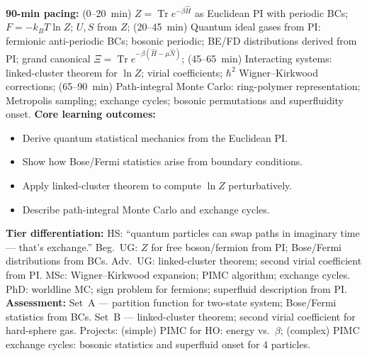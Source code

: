 \documentclass[11pt,a4paper]{article}
\begin{document}
\begin{tcolorbox}[modulebox, title={Module~II.2 --- Lecture L06: Statistical Mechanics Connection}]
\textbf{90-min pacing:} (0--20~min) $Z=\operatorname{Tr}e^{-\beta\hat{H}}$ as Euclidean PI with periodic BCs; $F=-k_BT\ln Z$; $U,S$ from $Z$; (20--45~min) Quantum ideal gases from PI: fermionic anti-periodic BCs; bosonic periodic; BE/FD distributions derived from PI; grand canonical $\Xi=\operatorname{Tr}e^{-\beta(\hat{H}-\mu\hat{N})}$; (45--65~min) Interacting systems: linked-cluster theorem for $\ln Z$; virial coefficients; $\hbar^2$ Wigner--Kirkwood corrections; (65--90~min) Path-integral Monte Carlo: ring-polymer representation; Metropolis sampling; exchange cycles; bosonic permutations and superfluidity onset.
\medskip\textbf{Core learning outcomes:}
\begin{itemize}[leftmargin=1.4em,topsep=2pt,itemsep=1pt]
  \item Derive quantum statistical mechanics from the Euclidean PI.
  \item Show how Bose/Fermi statistics arise from boundary conditions.
  \item Apply linked-cluster theorem to compute $\ln Z$ perturbatively.
  \item Describe path-integral Monte Carlo and exchange cycles.
\end{itemize}
\medskip\textbf{Tier differentiation:}
HS: ``quantum particles can swap paths in imaginary time --- that's exchange.''
Beg.\ UG: $Z$ for free boson/fermion from PI; Bose/Fermi distributions from BCs.
Adv.\ UG: linked-cluster theorem; second virial coefficient from PI.
MSc: Wigner--Kirkwood expansion; PIMC algorithm; exchange cycles.
PhD: worldline MC; sign problem for fermions; superfluid description from PI.
\medskip\textbf{Assessment:}
Set~A --- partition function for two-state system; Bose/Fermi statistics from BCs.
Set~B --- linked-cluster theorem; second virial coefficient for hard-sphere gas.
Projects: (simple) PIMC for HO: energy vs.\ $\beta$; (complex) PIMC exchange cycles: bosonic statistics and superfluid onset for 4 particles.
\end{tcolorbox}

\medskip
\end{document}
